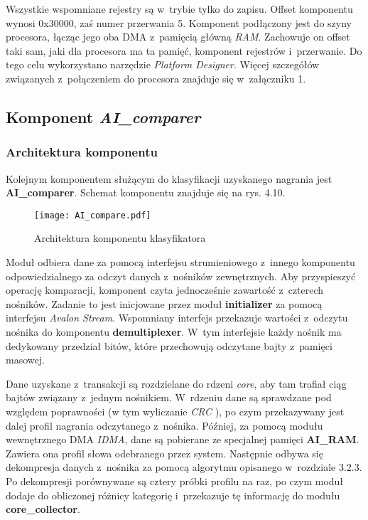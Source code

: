 Wszystkie wspomniane rejestry są w~trybie tylko do zapisu. Offset komponentu wynosi 0x30000, zaś numer przerwania 5. Komponent podłączony jest do szyny procesora, łącząc jego oba DMA z~pamięcią główną \textit{RAM}. Zachowuje on offset taki sam, jaki dla procesora ma ta pamięć, komponent rejestrów i~przerwanie. Do tego celu wykorzystano narzędzie \textit{Platform Designer}. Więcej szczegółów związanych z~połączeniem do procesora znajduje się w~załączniku 1.

\subsection{Komponent \textit{AI\_comparer}}
\subsubsection{Architektura komponentu}

Kolejnym komponentem służącym do klasyfikacji uzyskanego nagrania jest \textbf{AI\_comparer}. Schemat komponentu znajduje się na rys. 4.10.

\begin{figure}[h]
	\centering
	\texttt{[image: AI\_compare.pdf]}
	\caption{Architektura komponentu klasyfikatora}
\end{figure}
\FloatBarrier %

Moduł odbiera dane za pomocą interfejsu strumieniowego z~innego komponentu odpowiedzialnego za odczyt danych z~nośników zewnętrznych. Aby przyspieszyć operację komparacji, komponent czyta jednocześnie zawartość z~czterech nośników. Zadanie to jest inicjowane przez moduł \textbf{initializer} za pomocą interfejsu \textit{Avalon Stream}. Wspomniany interfejs przekazuje wartości z~odczytu nośnika do komponentu \textbf{demultiplexer}. W~tym interfejsie każdy nośnik ma dedykowany przedział bitów, które przechowują odczytane bajty z~pamięci masowej.

Dane uzyskane z~transakcji są rozdzielane do rdzeni \textit{core}, aby tam trafiał ciąg bajtów związany z~jednym nośnikiem. W~rdzeniu dane są sprawdzane pod względem poprawności (w tym wyliczanie \textit{CRC} \cite{Wiki:CRC}), po czym przekazywany jest dalej profil nagrania odczytanego z~nośnika. Później, za pomocą modułu wewnętrznego DMA \textit{IDMA}, dane są pobierane ze specjalnej pamięci \textbf{AI\_RAM}. Zawiera ona profil słowa odebranego przez system. Następnie odbywa się dekompresja danych z~nośnika za pomocą algorytmu opisanego w~rozdziale 3.2.3. Po dekompresji porównywane są cztery próbki profilu na raz, po czym moduł dodaje do obliczonej różnicy kategorię i~przekazuje tę informację do modułu \textbf{core\_collector}.

